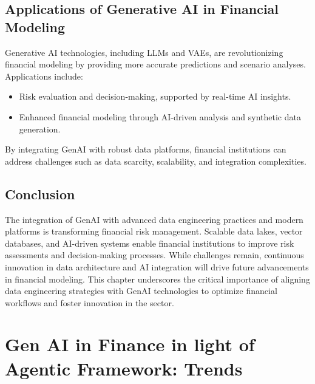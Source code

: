 \documentclass[a4paper,headinclude=on,footinclude=on,12pt,oneside]{scrbook}
\begin{document}
\section{Applications of Generative AI in Financial Modeling}
Generative AI technologies, including LLMs and VAEs, are revolutionizing financial modeling by providing more accurate predictions and scenario analyses. Applications include:
\begin{itemize}
	\item Risk evaluation and decision-making, supported by real-time AI insights.
	\item Enhanced financial modeling through AI-driven analysis and synthetic data generation.
\end{itemize}
By integrating GenAI with robust data platforms, financial institutions can address challenges such as data scarcity, scalability, and integration complexities.

\section{Conclusion}
The integration of GenAI with advanced data engineering practices and modern platforms is transforming financial risk management. Scalable data lakes, vector databases, and AI-driven systems enable financial institutions to improve risk assessments and decision-making processes. While challenges remain, continuous innovation in data architecture and AI integration will drive future advancements in financial modeling. This chapter underscores the critical importance of aligning data engineering strategies with GenAI technologies to optimize financial workflows and foster innovation in the sector.




\chapter{Gen AI in Finance in light of Agentic Framework: Trends }
\end{document}
